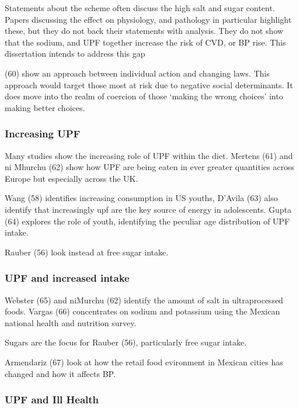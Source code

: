 \documentclass[
]{article}
\begin{document}
Statements about the scheme often discuss the high salt and sugar
content. Papers discussing the effect on physiology, and pathology in
particular highlight these, but they do not back their statements with
analysis. They do not show that the sodium, and UPF together increase
the risk of CVD, or BP rise. This dissertation intends to address this
gap

(60) show an approach between individual action and changing laws. This
approach would target those most at risk due to negative social
determinants. It does move into the realm of coercion of those `making
the wrong choices' into making better choices.

\hypertarget{increasing-upf}{%
\subsubsection{Increasing UPF}\label{increasing-upf}}

Many studies show the increasing role of UPF within the diet. Mertens
(61) and ni Mhurchu (62) show how UPF are being eaten in ever greater
quantities across Europe but especially across the UK.

Wang (58) identifies increasing consumption in US youths, D'Avila (63)
also identify that increasingly upf are the key source of energy in
adolescents. Gupta (64) explores the role of youth, identifying the
peculiar age distribution of UPF intake.

Rauber (56) look instead at free sugar intake.

\hypertarget{upf-and-increased-intake}{%
\subsubsection{UPF and increased
intake}\label{upf-and-increased-intake}}

Webster (65) and niMurchu (62) identify the amount of salt in
ultraprocessed foods. Vargas (66) concentrates on sodium and potassium
using the Mexican national health and nutrition survey.

Sugars are the focus for Rauber (56), particularly free sugar intake.

Armendariz (67) look at how the retail food evironment in Mexican cities
has changed and how it affects BP.

\hypertarget{upf-and-ill-health}{%
\subsubsection{UPF and Ill Health}\label{upf-and-ill-health}}
\end{document}
